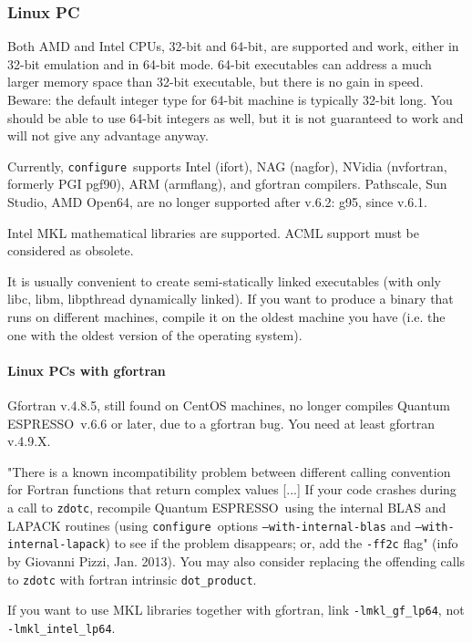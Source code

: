 \documentclass[12pt,a4paper]{article}
\def\qe{{\sc Quantum ESPRESSO}}
\def\configure{\texttt{configure}}
\begin{document}
\subsubsection{Linux PC}

Both AMD and Intel CPUs, 32-bit and 64-bit, are supported and work,
either in 32-bit emulation and in 64-bit mode. 64-bit executables
can address a much larger memory space than 32-bit executable, but
there is no gain in speed.
Beware: the default integer type for 64-bit machine is typically
32-bit long. You should be able to use 64-bit integers as well,
but it is not guaranteed to work and will not give
any advantage anyway.

Currently, \configure\ supports Intel (ifort), NAG (nagfor), NVidia
(nvfortran, formerly PGI pgf90), ARM (armflang),
and gfortran compilers. Pathscale, Sun Studio, AMD Open64, are no
longer supported after v.6.2: g95, since v.6.1.

Intel MKL mathematical libraries are supported. ACML support must be
considered as obsolete.

It is usually convenient to create semi-statically linked executables (with only
libc, libm, libpthread dynamically linked). If you want to produce a binary
that runs on different machines, compile it on the oldest machine you have
(i.e. the one with the oldest version of the operating system).

\paragraph{Linux PCs with gfortran}

Gfortran v.4.8.5, still found on CentOS machines, no longer compiles
\qe\ v.6.6 or later, due to a gfortran bug. You need at least gfortran v.4.9.X.

"There is a known incompatibility problem between different calling
convention for Fortran functions that return complex values [...]
If your code crashes during a call to \texttt{zdotc},
recompile \qe\ using the internal BLAS and LAPACK routines
(using \configure\ options \texttt{--with-internal-blas} and
\texttt{--with-internal-lapack})
to see if the problem disappears; or, add the \texttt{-ff2c} flag"
(info by Giovanni Pizzi, Jan. 2013).
You may also consider replacing the offending calls to \texttt{zdotc}
with fortran intrinsic \texttt{dot\_product}.

If you want to use MKL libraries together with gfortran,
link \texttt{-lmkl\_gf\_lp64}, not \texttt{-lmkl\_intel\_lp64}.
\end{document}

